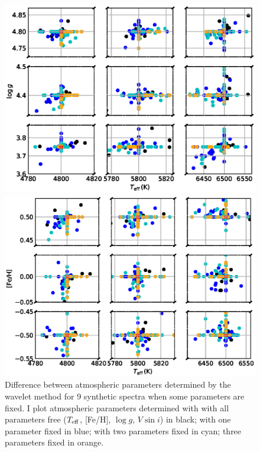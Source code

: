  \begin{figure}

    \includegraphics[scale=0.7]{5-images/self_test_2_TL.eps} 

    \includegraphics[scale=0.7]{5-images/self_test_2_TM.eps} 

  \caption{Difference between atmospheric parameters determined by the wavelet method for 9 synthetic spectra when some parameters are fixed. I plot atmospheric parameters determined with with all parameters free ($T_{\rm eff}$, [Fe/H], $\log g$, $V \sin i$) in black; with one parameter fixed in blue; with two parameters fixed in cyan; three parameters fixed in orange.  }
  \label{wavelet:fig:self_consistency_2}   
\end{figure}



